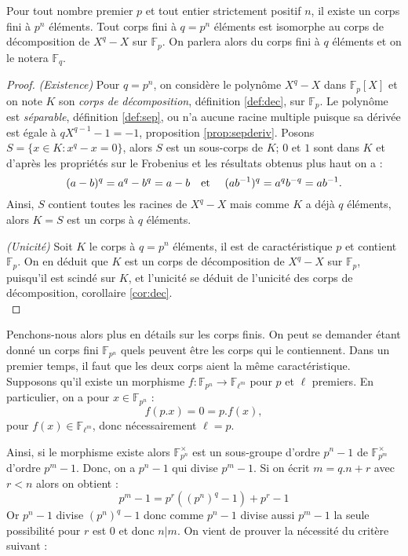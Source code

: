 \documentclass[a4paper]{article} %
\numberwithin{section}{part}
\numberwithin{equation}{section}
\newcommand\GF[1]{\mathbb{F}_{#1}}
\newcommand\etmath{\textup{\quad et \quad}}
\begin{document}
\begin{thm}
\label{th:isomGF}
Pour tout nombre premier $p$ et tout entier strictement positif $n$, il existe 
un corps fini à $p^n$ éléments. Tout corps fini à $q = p^n$ éléments est 
isomorphe au corps de décomposition de $X^q - X$ sur $\GF{p}$. On parlera 
alors du corps fini à $q$ éléments et on le notera $\GF{q}$.
\end{thm}
\begin{proof}
\textit{(Existence)} Pour $q = p^n$, on considère le polynôme $X^q - X$ dans 
$\GF{p}[X]$ et on note $K$ son \emph{corps de décomposition}, définition 
\ref{def:dec}, sur $\GF{p}$. Le polynôme est \emph{séparable}, définition 
\ref{def:sep}, ou n'a aucune racine multiple puisque sa dérivée est égale à 
$qX^{q-1} - 1 = -1$, proposition \ref{prop:sepderiv}. Posons $S=\lbrace x\in K 
: x^q - x = 0\rbrace$, alors $S$ est un sous-corps de $K$; $0$ et $1$ sont 
dans $K$ et d'après les propriétés sur le Frobenius et les résultats obtenus 
plus haut on a :
\begin{equation}
(a - b)^q = a^q - b^q = a - b \etmath(ab^{-1})^q = a^qb^{-q} = ab^{-1}.
\end{equation}
Ainsi, $S$ contient toutes les racines de $X^q - X$ mais comme $K$ a déjà $q$
éléments, alors $K = S$ est un corps à $q$ éléments.\par
\textit{(Unicité)} Soit $K$ le corps à $q = p^n$ éléments, il est de 
caractéristique $p$ et contient $\GF{p}$. On en déduit que $K$ est un corps de 
décomposition de $X^q - X$ sur $\GF{p}$, puisqu'il est scindé sur $K$, et 
l'unicité se déduit de l'unicité des corps de décomposition, corollaire 
\ref{cor:dec}.\\
\end{proof}

Penchons-nous alors plus en détails sur les corps finis. On peut se demander
étant donné un corps fini $\GF{p^n}$ quels peuvent être les corps qui le
contiennent. Dans un premier temps, il faut que les deux corps aient la même
caractéristique. Supposons qu'il existe un morphisme $f : \GF{p^n} \to 
\GF{\ell^m}$ pour $p$ et $\ell$ premiers. En particulier, on a pour 
$x\in\GF{p^n}$ :
\begin{equation}
f(p.x) = 0 = p.f(x),
\end{equation}
pour $f(x)\in\GF{\ell^m}$, donc nécessairement $\ell = p$.\par
Ainsi, si le morphisme existe alors $\GF{p^n}^{\times}$ est un sous-groupe
d'ordre $p^n - 1$ de $\GF{p^m}^{\times}$ d'ordre $p^m - 1$. Donc, on a $p^n - 1$
qui divise $p^m - 1$. Si on écrit $m = q.n + r$ avec $r < n$ alors on obtient :
\[p^m - 1 = p^r((p^n)^q - 1) + p^r - 1\]
Or $p^n - 1$ divise $(p^n)^q - 1$ donc comme $p^n - 1$ divise aussi $p^m - 1$ la
seule possibilité pour $r$ est $0$ et donc $n|m$. On vient de prouver la
nécessité du critère suivant :
\end{document}
